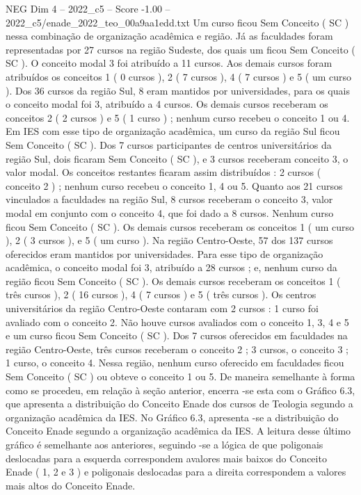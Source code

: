 \begin{textsample}{NEG Dim 4 – 2022\_c5 – Score -1.00 – 2022\_c5/enade\_2022\_teo\_00a9aa1edd.txt}
Um curso ficou Sem Conceito ( SC ) nessa combinação de organização acadêmica e região.
Já as faculdades foram representadas por 27 cursos na região Sudeste, dos quais um ficou Sem Conceito ( SC ).
O conceito modal 3 foi atribuído a 11 cursos.
Aos demais cursos foram atribuídos os conceitos 1 ( 0 cursos ), 2 ( 7 cursos ), 4 ( 7 cursos ) e 5 ( um curso ).
Dos 36 cursos da região Sul, 8 eram mantidos por universidades, para os quais o conceito modal foi 3, atribuído a 4 cursos.
Os demais cursos receberam os conceitos 2 ( 2 cursos ) e 5 ( 1 curso ) ; nenhum curso recebeu o conceito 1 ou 4.
Em IES com esse tipo de organização acadêmica, um curso da região Sul ficou Sem Conceito ( SC ).
Dos 7 cursos participantes de centros universitários da região Sul, dois ficaram Sem Conceito ( SC ), e 3 cursos receberam conceito 3, o valor modal.
Os conceitos restantes ficaram assim distribuídos : 2 cursos ( conceito 2 ) ; nenhum curso recebeu o conceito 1, 4 ou 5.
Quanto aos 21 cursos vinculados a faculdades na região Sul, 8 cursos receberam o conceito 3, valor modal em conjunto com o conceito 4, que foi dado a 8 cursos.
Nenhum curso ficou Sem Conceito ( SC ).
Os demais cursos receberam os conceitos 1 ( um curso ), 2 ( 3 cursos ), e 5 ( um curso ).
Na região Centro-Oeste, 57 dos 137 cursos oferecidos eram mantidos por universidades.
Para esse tipo de organização acadêmica, o conceito modal foi 3, atribuído a 28 cursos ; e, nenhum curso da região ficou Sem Conceito ( SC ).
Os demais cursos receberam os conceitos 1 ( três cursos ), 2 ( 16 cursos ), 4 ( 7 cursos ) e 5 ( três cursos ).
Os centros universitários da região Centro-Oeste contaram com 2 cursos : 1 curso foi avaliado com o conceito 2.
Não houve cursos avaliados com o conceito 1, 3, 4 e 5 e um curso ficou Sem Conceito ( SC ).
Dos 7 cursos oferecidos em faculdades na região Centro-Oeste, três cursos receberam o conceito 2 ; 3 cursos, o conceito 3 ; 1 curso, o conceito 4.
Nessa região, nenhum curso oferecido em faculdades ficou Sem Conceito ( SC ) ou obteve o conceito 1 ou 5.
De maneira semelhante à forma como se procedeu, em relação à seção anterior, encerra -se esta com o Gráfico 6.3, que apresenta a distribuição do Conceito Enade dos cursos de Teologia segundo a organização acadêmica da IES.
No Gráfico 6.3, apresenta -se a distribuição do Conceito Enade segundo a organização acadêmica da IES.
A leitura desse último gráfico é semelhante aos anteriores, seguindo -se a lógica de que poligonais deslocadas para a esquerda correspondem avalores mais baixos do Conceito Enade ( 1, 2 e 3 ) e poligonais deslocadas para a direita correspondem a valores mais altos do Conceito Enade.

\end{textsample}
